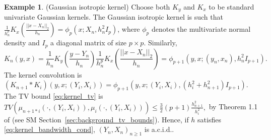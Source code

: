 \documentclass{article}
\theoremstyle{definition}
\newtheorem{example}{Example}
\renewcommand{\&}{and}
\begin{document}
\begin{example} (Gaussian isotropic kernel) Choose both $K_y$ and $K_x$ to be standard univariate Gaussian kernels. The Gaussian isotropic kernel is such that $\frac{1}{h^p_n} K_x\left(\frac{||x-X_n||_2}{h_n}\right)=\phi_p\left(x;X_n,h^2_n I_p\right)$, where $\phi_p$ denotes the multivariate normal density and $I_p$ a diagonal matrix of size $p\times p$. Similarly,
	\[
	K_n(y,x) = \frac{1}{h_n}K_y \left(\frac{y-Y_n}{h_n}\right)\frac{1}{h^p_n}K_x\left(\frac{||x-X_n||_2}{h_n}\right) =\phi_{p+1}(y,x;(y_{n},x_{n}),h_{n}^{2} I_{p+1}).
	\]
	The kernel convolution is
	$(K_{n+1} * K_{i})(y,x;(Y_i,X_i))
	= \phi_{p+1}(y,x;(Y_i,X_{i}), (h_{i}^{2}+h_{n+1}^{2})I_{p+1})$.
The TV bound \eqref{eq:kernel_tv} is
	 $TV(\mu_{n+1*i}(\cdot,(Y_i,X_i)), \mu_{i}(\cdot,(Y_i,X_i))) \leq \frac{3}{2} (p+1)\frac{h^2_{n+1}}{h^2_{i}},$
by Theorem 1.1 of \cite{devroye2018total} (see SM Section~\ref{sec:background_tv_bounds}). Hence, if $h$ satisfies \eqref{eq:kernel_bandwidth_cond},  $(Y_n,X_n)_{n \geq 1}$ is a.c.i.d..

\end{example}
\end{document}
